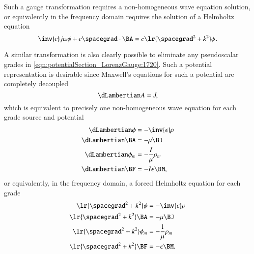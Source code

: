 Such a gauge transformation requires a non-homogeneous wave equation solution, or equivalently in the frequency domain requires the solution of a Helmholtz equation
\begin{dmath}\label{eqn:potentialSection_LorenzGauge:1740}
\inv{c} j \omega \phi + c \spacegrad \cdot \BA
= c \lr{ \spacegrad^2 + k^2 } \psi.
\end{dmath}

A similar transformation is also clearly possible to eliminate any pseudoscalar grades in \cref{eqn:potentialSection_LorenzGauge:1720}.
Such a potential representation is desirable since
Maxwell's equations for such a potential are completely decoupled
\begin{dmath}\label{eqn:potentialSection_LorenzGauge:1760}
\dLambertian
A = J,
\end{dmath}
which is equivalent to precisely one non-homogeneous wave equation for each grade source and potential
\begin{dmath}\label{eqn:potentialSection_LorenzGauge:1600}
\begin{aligned}
\dLambertian
\phi &= - \inv{\epsilon} \rho \\
\dLambertian
\BA &= - \mu \BJ \\
\dLambertian
\phi_m &= - \frac{I}{\mu} \rho_m \\
\dLambertian
\BF &= - I \epsilon \BM,
\end{aligned}
\end{dmath}
or equivalently, in the frequency domain, a forced Helmholtz equation for each grade
\begin{dmath}\label{eqn:potentialSection_LorenzGauge:1780}
\begin{aligned}
\lr{ \spacegrad^2 + k^2 } \phi &= - \inv{\epsilon} \rho \\
\lr{ \spacegrad^2 + k^2 } \BA &= - \mu \BJ \\
\lr{ \spacegrad^2 + k^2 } \phi_m &= - \frac{1}{\mu} \rho_m \\
\lr{ \spacegrad^2 + k^2 } \BF &= - \epsilon \BM.
\end{aligned}
\end{dmath}
